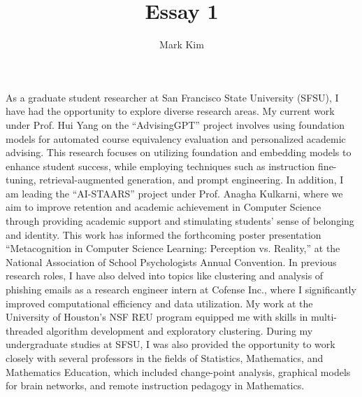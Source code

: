 \documentclass[12pt]{article}
\author{Mark Kim}
\title{Essay 1}
\begin{document}
\maketitle

As a graduate student researcher at San Francisco State University (SFSU), I have had the opportunity to explore diverse research areas. My
current work under Prof. Hui Yang on the ``AdvisingGPT'' project involves using foundation models for automated course equivalency evaluation and
personalized academic advising. This research focuses on utilizing foundation and embedding models to enhance student success, while
employing techniques such as instruction fine-tuning, retrieval-augmented generation, and prompt engineering. In addition, I am leading
the ``AI-STAARS'' project under Prof. Anagha Kulkarni, where we aim to improve retention and academic achievement in Computer Science through
providing academic support and stimulating students' sense of belonging and identity.  This work has informed the forthcoming
poster presentation ``Metacognition in Computer Science Learning: Perception vs. Reality,'' at the National Association of School
Psychologists Annual Convention.  In previous research roles, I have also delved into topics like clustering and analysis of phishing emails
as a research engineer intern at Cofense Inc., where I significantly improved computational efficiency and data utilization. My work at the
University of Houston's NSF REU program equipped me with skills in multi-threaded algorithm development and exploratory clustering.  During
my undergraduate studies at SFSU, I was also provided the opportunity to work closely with several professors in the fields of
Statistics, Mathematics, and Mathematics Education, which included change-point analysis, graphical models for brain networks, and remote
instruction pedagogy in Mathematics.
\end{document}
